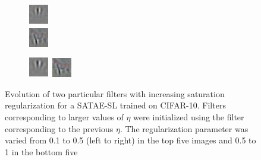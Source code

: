 \documentclass{article} %
\begin{document}
\begin{figure}
\begin{subfigure}[b]{0.15\textwidth}
	\end{subfigure} 
	\begin{subfigure}[b]{0.15\textwidth}
		\centering 
		\includegraphics[scale=2]{./Figures/objects/edge/4.png} \\
		\includegraphics[scale=2]{./Figures/objects/horse2/4.png} 
	\end{subfigure} 
	\begin{subfigure}[b]{0.15\textwidth}
		\centering 
		\includegraphics[scale=2]{./Figures/objects/edge/5.png}
		\includegraphics[scale=2]{./Figures/objects/horse2/5.png} \\
		
	\end{subfigure} 
\caption{Evolution of two particular filters with increasing saturation regularization for a SATAE-SL trained on CIFAR-10. Filters corresponding to larger values of $\eta$ were initialized using the filter corresponding to the previous $\eta$. The regularization parameter was varied from 0.1 to 0.5 (left to right) in the top five images and 0.5 to 1 in the bottom five }
\label{fig:horse}
\end{figure} 
\end{document}
